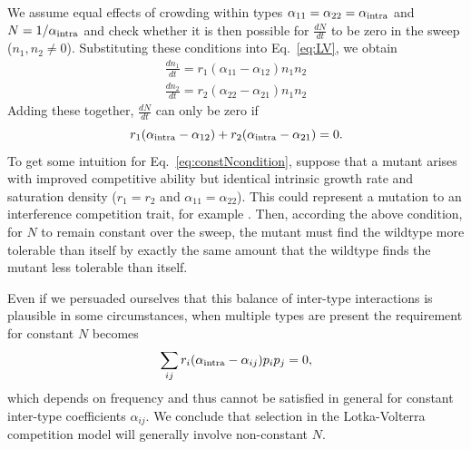 \documentclass[11pt]{article}
\begin{document}
We assume equal effects of crowding within types $\alpha_{11}=\alpha_{22}=\alpha_{\rm intra}$ and $N=1/\alpha_{\rm intra}$ and check whether it is then possible for $\frac{dN}{dt}$ to be zero in the sweep ($n_1,n_2 \neq 0$). Substituting these conditions into Eq.~\eqref{eq:LV}, we obtain 
\begin{align}
\frac{d n_1}{dt} = r_1(\alpha_{11}-\alpha_{12})n_1n_2 \nonumber\\
\frac{d n_2}{dt} = r_2(\alpha_{22}-\alpha_{21})n_1n_2
\end{align}
Adding these together, $\frac{dN}{dt}$ can only be zero if 
\begin{equation}
r_1(\alpha_{\rm intra}-\alpha_{12})+r_2(\alpha_{\rm intra}-\alpha_{21})=0. \label{eq:constNcondition}
\end{equation}
To get some intuition for Eq.~\eqref{eq:constNcondition}, suppose that a mutant arises with improved competitive ability but identical intrinsic growth rate and saturation density ($r_1=r_2$ and $\alpha_{11}=\alpha_{22}$). This could represent a mutation to an interference competition trait, for example \citep{gill_1974}. Then, according the above condition, for $N$ to remain constant over the sweep, the mutant must find the wildtype more tolerable than itself by exactly the same amount that the wildtype finds the mutant less tolerable than itself.  

Even if we persuaded ourselves that this balance of inter-type interactions is plausible in some circumstances, when multiple types are present the requirement for constant $N$ becomes
\begin{equation}
\sum_{ij}r_i(\alpha_{\rm intra}-\alpha_{ij})p_ip_j=0,
\end{equation}
which depends on frequency and thus cannot be satisfied in general for constant inter-type coefficients $\alpha_{ij}$. We conclude that selection in the Lotka-Volterra competition model will generally involve non-constant $N$.
\end{document}
